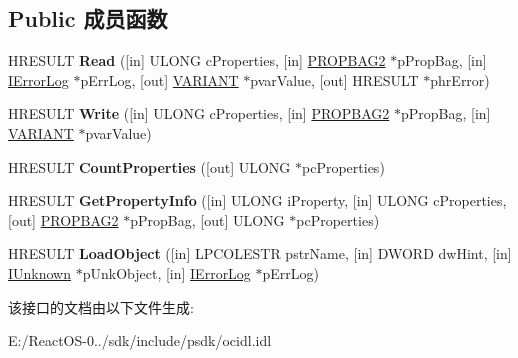 \subsection*{Public 成员函数}
\begin{DoxyCompactItemize}
\item 
\mbox{\label{interface_i_property_bag2_a5b5c7bf6c891280a56f91d62e505e485}} 
H\+R\+E\+S\+U\+LT {\bfseries Read} (\mbox{[}in\mbox{]} U\+L\+O\+NG c\+Properties, \mbox{[}in\mbox{]} \hyperlink{struct_i_property_bag2_1_1tag_p_r_o_p_b_a_g2}{P\+R\+O\+P\+B\+A\+G2} $\ast$p\+Prop\+Bag, \mbox{[}in\mbox{]} \hyperlink{interface_i_error_log}{I\+Error\+Log} $\ast$p\+Err\+Log, \mbox{[}out\mbox{]} \hyperlink{structtag_v_a_r_i_a_n_t}{V\+A\+R\+I\+A\+NT} $\ast$pvar\+Value, \mbox{[}out\mbox{]} H\+R\+E\+S\+U\+LT $\ast$phr\+Error)
\item 
\mbox{\label{interface_i_property_bag2_afb122896e9c37ef7ac592b764113b6bc}} 
H\+R\+E\+S\+U\+LT {\bfseries Write} (\mbox{[}in\mbox{]} U\+L\+O\+NG c\+Properties, \mbox{[}in\mbox{]} \hyperlink{struct_i_property_bag2_1_1tag_p_r_o_p_b_a_g2}{P\+R\+O\+P\+B\+A\+G2} $\ast$p\+Prop\+Bag, \mbox{[}in\mbox{]} \hyperlink{structtag_v_a_r_i_a_n_t}{V\+A\+R\+I\+A\+NT} $\ast$pvar\+Value)
\item 
\mbox{\label{interface_i_property_bag2_add89403b35c54547772881be0c5b06b1}} 
H\+R\+E\+S\+U\+LT {\bfseries Count\+Properties} (\mbox{[}out\mbox{]} U\+L\+O\+NG $\ast$pc\+Properties)
\item 
\mbox{\label{interface_i_property_bag2_ab1b5a1f42c46f6c3709cbde81028a260}} 
H\+R\+E\+S\+U\+LT {\bfseries Get\+Property\+Info} (\mbox{[}in\mbox{]} U\+L\+O\+NG i\+Property, \mbox{[}in\mbox{]} U\+L\+O\+NG c\+Properties, \mbox{[}out\mbox{]} \hyperlink{struct_i_property_bag2_1_1tag_p_r_o_p_b_a_g2}{P\+R\+O\+P\+B\+A\+G2} $\ast$p\+Prop\+Bag, \mbox{[}out\mbox{]} U\+L\+O\+NG $\ast$pc\+Properties)
\item 
\mbox{\label{interface_i_property_bag2_a8a13449e7d96cbe4df7bd4156a3b0dc3}} 
H\+R\+E\+S\+U\+LT {\bfseries Load\+Object} (\mbox{[}in\mbox{]} L\+P\+C\+O\+L\+E\+S\+TR pstr\+Name, \mbox{[}in\mbox{]} D\+W\+O\+RD dw\+Hint, \mbox{[}in\mbox{]} \hyperlink{interface_i_unknown}{I\+Unknown} $\ast$p\+Unk\+Object, \mbox{[}in\mbox{]} \hyperlink{interface_i_error_log}{I\+Error\+Log} $\ast$p\+Err\+Log)
\end{DoxyCompactItemize}


该接口的文档由以下文件生成\+:\begin{DoxyCompactItemize}
\item 
E\+:/\+React\+O\+S-\/0../sdk/include/psdk/ocidl.\+idl\end{DoxyCompactItemize}
